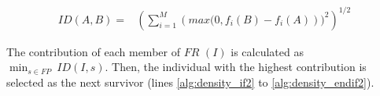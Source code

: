 \begin{equation} \label{eq:ImprovementDistance}
\begin{split}
 ID(A, B) = &  \left (\sum_{i=1}^M \left (max(0, f_i(B) - f_i(A) \right ))^2  \right)^{1/2}
\end{split}
\end{equation}

The contribution of each member of $FR$ $(I)$ is calculated as $\displaystyle{\min_{s \in FP}\ ID(I, s)}$.
%
Then, the individual with the highest contribution is selected as the next survivor (lines \ref{alg:density_if2} 
to \ref{alg:density_endif2}).

